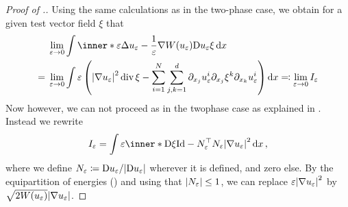 \begin{proof}[Proof of .]
	Using the same calculations as in the two-phase case, we obtain for a given 
	test vector field $ \xi $ that
	\begin{align*}
		& \lim_{ \varepsilon \to 0 }
		\int
		\inner*{
			\varepsilon \Delta u_{ \varepsilon }
			-
			\frac{ 1 }{ \varepsilon } \nabla W ( u_{ \varepsilon } )
		}
		{
			\diff{ u_{ \varepsilon } } \xi
		}
		\dd{ x }
		\\
		={} &
		\lim_{ \varepsilon \to 0 }
		\int
		\varepsilon
		\left(
		\abs{ \nabla u_{ \varepsilon } }^{ 2 }
		\divg \xi 
		-
		\sum_{ i = 1 }^{ N }
		\sum_{ j, k = 1 }^{ d }
		\partial_{ x_{ j } } u_{ \varepsilon }^{ i }
		\partial_{ x_{ j } } \xi^{ k }
		\partial_{ x_{ k } } u_{ \varepsilon }^{ i }
		\right)
		\dd{ x } 
		\eqqcolon 
		\lim_{ \varepsilon \to 0 } I_{ \varepsilon }
	\end{align*}
	Now however, we can not proceed as in the twophase case as explained in 
	. 
	Instead we rewrite
	\begin{equation}
		\label{key_equality_for_ptw_estimate}
		I_{ \varepsilon }
		=
		\int
		\varepsilon
		\inner*{
			\diff \xi 
		}
		{
			\mathrm{Id} - N_{ \varepsilon }^{ \top } N_{ \varepsilon }
		}
		\abs{ \nabla u_{ \varepsilon } }^{ 2 }
		\dd{ x },
	\end{equation}
	where we define $ N_{ \varepsilon } \coloneqq \mathrm{D} u_{ \varepsilon } / 
	\abs{ \mathrm{D} u_{ \varepsilon } } $ wherever it is defined, and zero else. 
	By the equipartition of energies 
	() and using that 
	$ \abs{N_{ \varepsilon } } \leq 1 $, we can replace $ \varepsilon \abs{ 
	\nabla u_{ 
	\varepsilon } }^{ 2 } $ by $ \sqrt{ 2 W ( u_{ \varepsilon } ) } \abs{ 
	\nabla u_{ \varepsilon  } } $. 
	

\end{proof}
